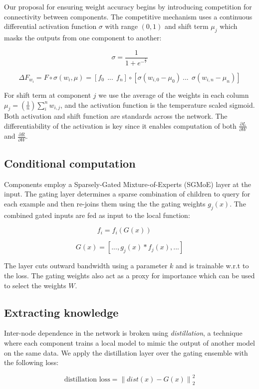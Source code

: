 \documentclass{article}
\begin{document}
Our proposal for ensuring weight accuracy begins by introducing competition for connectivity between components. The competitive mechanism uses a continuous differential activation function $\sigma$ with range $(0,1)$ and shift term $\mu_j$ which masks the outputs from one component to another:
\bigskip

\[\sigma =  \frac{1}{ 1 + e^-^\frac{x}{T}} \]

\[\Delta F_w_i = F \circ \sigma(w_i, \mu) = [f_0 \ \ ... \ \ f_n] \circ [\sigma(w_{i,0} - \mu_0) \   ... \ \ \sigma(w_{i,n} - \mu_n)] \]

For shift term at component $j$ we use the average of the weights in each column $\mu_j = (\frac{1}{n}) \sum_{i}^{n}{w_{i,j}}$, and the activation function is the temperature scaled sigmoid. Both activation and shift function are standards across the network. The differentiability of the activation is key since it enables computation of both $\frac{\partial L}{\partial W}$ and $\frac{\partial R}{\partial W}$. 

\subsection{Conditional computation}

Components employ a Sparsely-Gated Mixture-of-Experts (SGMoE) layer at the input. The gating layer determines a sparse combination of children to query for each example and then re-joins them using the the gating weights $g_j(x)$. The combined gated inputs are fed as input to the local function: 

\[f_i = f_i(G(x)) \ \ \ \  \textrm{ }\]

\[ G(x) = [ ..., g_j(x) * f_j(x), ...] \]

The layer cuts outward bandwidth using a parameter $k$ and is trainable w.r.t to the loss. The gating weights also act as a proxy for importance which can be used to select the weights $W$.

\subsection{Extracting knowledge}

Inter-node dependence in the network is broken using \textit{distillation}, a technique where each component trains a local model to mimic the output of another model on the same data. We apply the distillation layer over the gating ensemble with the following loss:
\smallskip

\[ \textrm{distillation loss} = \left\| dist(x) - G(x) \right\|^2_2 \]
\end{document}
